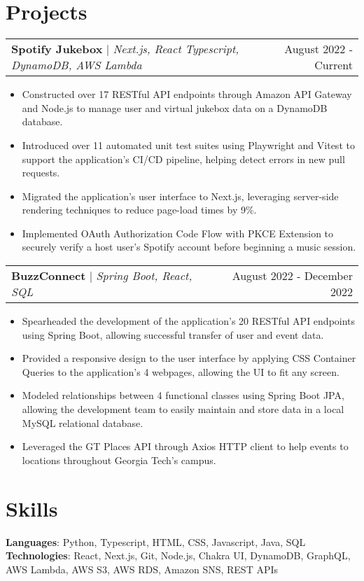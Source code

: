 \documentclass[letterpaper,11pt]{article}
\makeatletter
\newcommand{\resumeProjectHeading}[3]{
    \begin{tabular*}{0.97\textwidth}[t]{l@{\extracolsep{\fill}}r}
      \textbf{#1} $\vert$ \textit{#2}  & {#3}
    \end{tabular*}\vspace{-3pt}
}
\newcommand{\resumeItemListStart}{\begin{itemize}[noitemsep]\vspace{-4pt}}
\newcommand{\resumeItemListEnd}{\end{itemize}}
\makeatother
\begin{document}
\section{Projects}
    \resumeProjectHeading{Spotify Jukebox}{Next.js, React Typescript, DynamoDB, AWS Lambda }{August 2022 - Current}
      \resumeItemListStart
        \item {Constructed over 17 RESTful API endpoints through Amazon API Gateway and Node.js to manage user and virtual jukebox data on a DynamoDB database.}
        \item {Introduced over 11 automated unit test suites using Playwright and Vitest to support the application's CI/CD pipeline, helping detect errors in new pull requests.}
        \item {Migrated the application's user interface to Next.js, leveraging server-side rendering techniques to reduce page-load times by 9\%.}
        \item {Implemented OAuth Authorization Code Flow with PKCE Extension to securely verify a host user's Spotify account before beginning a music session.}
      \resumeItemListEnd

    \resumeProjectHeading{BuzzConnect}{Spring Boot, React, SQL}{August 2022 - December 2022}
      \resumeItemListStart
        \item {Spearheaded the development of the application's 20 RESTful API endpoints using Spring Boot,  allowing successful transfer of user and event data.}
        \item {Provided a responsive design to the user interface by applying CSS Container Queries to the application's 4 webpages, allowing the UI to fit any screen.}
        \item {Modeled relationships between 4 functional classes using Spring Boot JPA, allowing the development team to easily maintain and store data in a local MySQL relational database.}
        \item {Leveraged the GT Places API through Axios HTTP client to help events to locations throughout Georgia Tech's campus.}
      \resumeItemListEnd

\section{Skills}
    \textbf{Languages}{: Python, Typescript, HTML, CSS, Javascript, Java, SQL } \\
    \textbf{Technologies}{: React, Next.js, Git, Node.js, Chakra UI, DynamoDB, GraphQL, AWS Lambda, AWS S3, AWS RDS, Amazon SNS, REST APIs}
\end{document}
